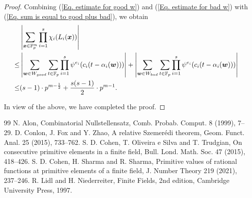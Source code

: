 \documentclass[10pt,a4paper]{amsart}
\def\w{{\bm w}}
\def\x{{\bm x}}
\def\bad{{\rm bad}}
\def\good{{\rm good}}
\begin{document}
\begin{proof}
Combining (\ref{Eq. estimate for good w}) and (\ref{Eq. estimate for bad w}) with (\ref{Eq. sum is equal to good plus bad}), we obtain 
\begin{align*}
	 &\left|\sum_{\x\in\mathbb{F}_p^m}\prod_{i=1}^{s}\chi_i(L_i(\x))\right|\\
\le &\left|\sum_{\w\in W_{\good}}\sum_{t\in\mathbb{F}_p}\prod_{i=1}^{s}\psi^{e_i}(c_i(t-\alpha_i(\w)))\right|+\left|\sum_{\w\in W_{\bad}}\sum_{t\in\mathbb{F}_p}\prod_{i=1}^{s}\psi^{e_i}(c_i(t-\alpha_i(\w)))\right|\\
\le & (s-1)\cdot p^{m-\frac{1}{2}}+\frac{s(s-1)}{2}\cdot p^{m-1}.
\end{align*}
		
In view of the above, we have completed the proof. 
	\end{proof}

\begin{thebibliography}{99}
 N. Alon, Combinatorial Nullstellensatz, Comb. Probab. Comput. 8 (1999), 7--29.
 D. Conlon, J. Fox and Y. Zhao, A relative Szemer\'edi theorem, Geom. Funct. Anal. 25 (2015), 733--762.
 S. D. Cohen, T. Oliveira e Silva and T. Trudgian, On consecutive primitive elements in a finite field, Bull. Lond. Math. Soc. 47 (2015), 418--426.
 S. D. Cohen, H. Sharma and R. Sharma, Primitive values of rational functions at primitive elements of a finite field, J. Number Theory 219 (2021), 237--246.
 R. Lidl and H. Niederreiter, Finite Fields, 2nd edition, Cambridge University Press, 1997.
\end{thebibliography}
\end{document}
